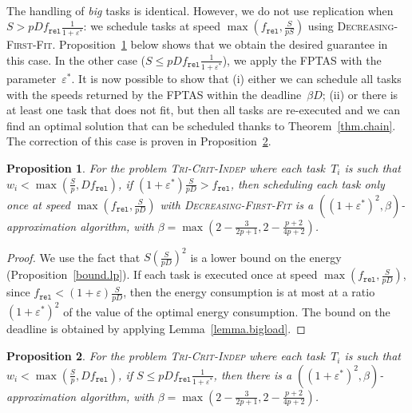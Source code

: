 \documentclass[a4paper]{article}
\theoremstyle{plain}
\newtheorem{proposition}{Proposition}
\theoremstyle{definition}
\theoremstyle{remark}
\newcommand{\fr}{\ensuremath{f_{\texttt{rel}}}\xspace}
\newcommand{\dff}{\textsc{Dec\-reasing-First-Fit}\xspace}
\newcommand{\indep}{\textsc{Tri-Crit-In\-dep}\xspace}
\begin{document}
\medskip
{} \\
The handling of {\em big} tasks is identical. However, we do not use
replication when $S> pD\fr \frac{1}{1+\varepsilon^*}$: 
we schedule tasks at speed $\max(\fr,\frac{S}{pS})$ using
\dff. Proposition~\ref{prop.epsilon1} below shows that we obtain the
desired guarantee in this case.  
In the other case ($S \leq pD\fr \frac{1}{1+\varepsilon^*}$), we apply
the FPTAS with the parameter~$\varepsilon^*$. It is now possible to
show that (i) either we can schedule all tasks with the speeds returned by the
FPTAS within the deadline~$\beta D$; (ii) or there is at least one
task that does not fit, but then all tasks are re-executed and we can find
an optimal solution that can be scheduled thanks to
Theorem~\ref{thm.chain}. The correction of this case is proven in
Proposition~\ref{prop.2}. 

\begin{proposition}
 \label{prop.epsilon1}
 For the problem \indep where each task~$T_i$ is such that
 $w_i\!<\!\max(\frac{S}{p},D\fr)$, if  $(1\!+\!\varepsilon^*)\frac{S}{pD} \!>\! \fr$, then scheduling each
 task only once at speed $\max(\fr,\frac{S}{pD})$ with \dff
 is a $\left( \left( 1+\varepsilon^* \right)^2,
   \beta\right)$-approxi\-mation algorithm, with $\beta \!=\!
 \max\left(\!2\!-\!\frac{3}{2p+1}, 2\!-\!\frac{p+2}{4p+2}\!\right)$.
\end{proposition}

\begin{proof}
  We use the fact that $S(\frac{S}{pD})^2$ is a lower bound on the
  energy (Proposition~\ref{bound.lp}).  If each task is executed once
  at speed $\max(\fr,\frac{S}{pD})$, since $\fr <
  (1+\varepsilon)\frac{S}{pD}$, then the energy consumption is
  at most at a ratio $\left( 1\!+\!\varepsilon^* \right )^2$ of
  the value of the optimal energy consumption. 
  The bound on the deadline is obtained by applying
  Lemma~\ref{lemma.bigload}. 
\end{proof}


\begin{proposition}
\label{prop.2}
For the problem \indep where each task~$T_i$ is such that
 $w_i<\max(\frac{S}{p},D\fr)$, if $S \leq pD\fr
 \frac{1}{1+\varepsilon^*}$, then there is a $\left( \left(
     1+\varepsilon^* \right)^2, \beta\right)$-approxi\-mation
 algorithm, with $\beta \!=\!
 \max\left(\!2\!-\!\frac{3}{2p+1}, 2\!-\!\frac{p+2}{4p+2}\!\right)$. 
\end{proposition}
\end{document}
